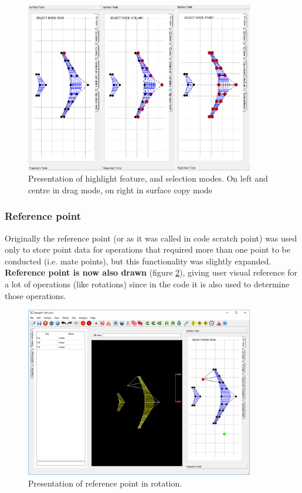 \documentclass[a4paper, 11pt, article]{report}
\begin{document}
\begin{figure}[!h]
	\centering
	
	\includegraphics[width=10cm]{images/highlight_feature.png}
	
	\caption{Presentation of highlight feature, and selection modes. On left and centre in drag mode, on right in surface copy mode}
	
	\label{highlight_selection}
\end{figure}

\subsubsection{Reference point}

Originally the reference point (or as it was called in code scratch point) was used only to store point data for operations that required more than one point to be conducted (i.e. mate points), but this functionality was slightly expanded. \textbf{Reference point is now also drawn} (figure \ref{Reference}), giving user visual reference for a lot of operations (like rotations) since in the code it is also used to determine those operations.

\begin{figure}[!h]
	\centering
	
	\includegraphics[width=10cm]{images/reference_point.png}
	
	\caption{Presentation of reference point in rotation.}
	
	\label{Reference}
\end{figure}
\end{document}
